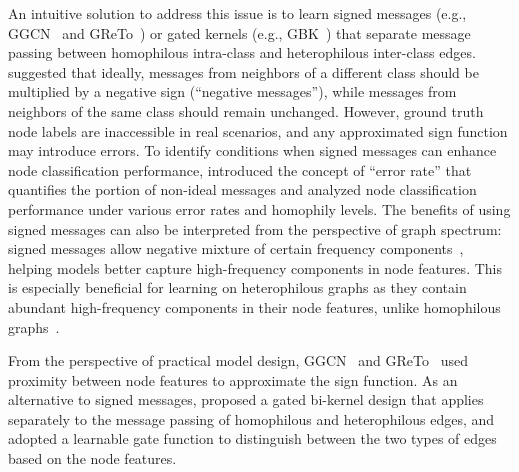 An intuitive solution to address this issue is to learn signed messages (e.g., GGCN~\cite{yan2022two} and GReTo~\cite{zhou2023greto}) or gated kernels (e.g., GBK~\cite{du2022gbk}) that separate message passing between homophilous intra-class and heterophilous inter-class edges. \citet{yan2022two} suggested that ideally, messages from neighbors of a different class should be multiplied by a negative sign (``negative messages''), while messages from neighbors of the same class should remain unchanged. However, ground truth node labels are inaccessible in real scenarios, and any approximated sign function may introduce errors. To identify conditions when signed messages can enhance node classification performance, \cite{yan2022two} introduced the concept of ``error rate'' that quantifies the portion of non-ideal messages and analyzed node classification performance under various error rates and homophily levels.
The benefits of using signed messages can also be interpreted from the perspective of graph spectrum: signed messages allow negative mixture of certain frequency components~\cite{zhang2021beyond, chien2021adaptive}, helping models better capture high-frequency components in node features. This is especially beneficial for learning on heterophilous graphs as they contain abundant high-frequency components in their node features, unlike homophilous graphs~\cite{zhu2020beyond}.

From the perspective of practical model design, GGCN~\cite{yan2022two} and GReTo~\cite{zhou2023greto} used proximity between node features to approximate the sign function. As an alternative to signed messages, \citet{du2022gbk} proposed a gated bi-kernel design that applies separately to the message passing of homophilous and heterophilous edges, and adopted a learnable gate function to distinguish between the two types of edges based on the node features.

